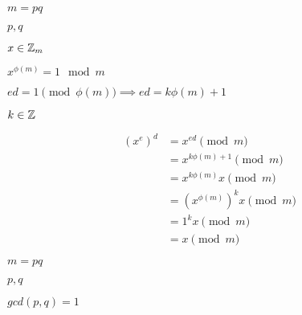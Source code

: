 \documentclass[10pt]{book}
\begin{document}
\begin{mdSnippets}
\begin{mdInlineSnippet}[df8aeac02449ed7c78c17be7ef5e0169]%
$m = pq$\end{mdInlineSnippet}%
\begin{mdInlineSnippet}[c1753c36ab4eb582f1420d5178cb4bc5]%
$p,q$\end{mdInlineSnippet}%
\begin{mdInlineSnippet}[88aae868066d20be1d9147798a16c6ff]%
$x \in \mathbb{Z}_m$\end{mdInlineSnippet}%
\begin{mdInlineSnippet}%
$x^{\phi(m)} = 1 \mod m$\end{mdInlineSnippet}%
\begin{mdInlineSnippet}[e29d30cd0a4e21f5ce9b99ef89033aaf]%
$ed = 1 \pmod {\phi(m)} \implies ed = k\phi(m) + 1$\end{mdInlineSnippet}%
\begin{mdInlineSnippet}[ab7b589c32d33eff3dd7af7bf9848b99]%
$k \in \mathbb{Z}$\end{mdInlineSnippet}%
\begin{mdDisplaySnippet}[0299125cf9a1f69dd835f75b356161e8]%
\[%
\begin{aligned}
(x^e)^d &= x^{ed} \pmod{m} \\
&= x^{k\phi(m) + 1} \pmod{m}\\
&=  x^{k\phi(m)}x \pmod{m}\\
&= (x^{\phi(m)})^kx\pmod{m} \\
&= 1^kx \pmod{m}\\
&= x \pmod{m}
\end{aligned}
\]%
\end{mdDisplaySnippet}%
\begin{mdInlineSnippet}[df8aeac02449ed7c78c17be7ef5e0169]%
$m = pq$\end{mdInlineSnippet}%
\begin{mdInlineSnippet}[c1753c36ab4eb582f1420d5178cb4bc5]%
$p,q$\end{mdInlineSnippet}%
\begin{mdInlineSnippet}%
$gcd(p,q) = 1$\end{mdInlineSnippet}%
\begin{mdInlineSnippet}[993112e1bfa4a82f83df8b71e6e6d81a]%

\end{mdInlineSnippet}
\end{mdSnippets}
\end{document}
